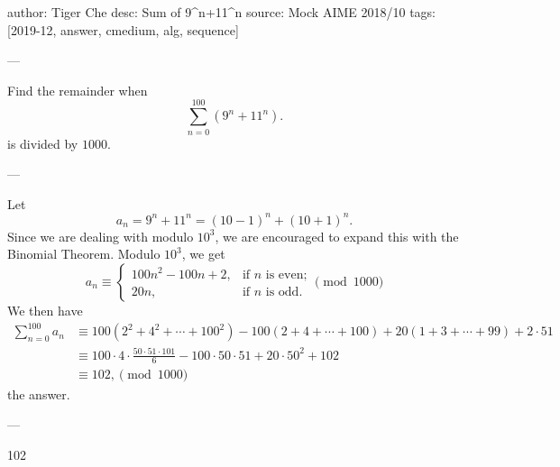 author: Tiger Che
desc: Sum of 9^n+11^n
source: Mock AIME 2018/10
tags: [2019-12, answer, cmedium, alg, sequence]

---

Find the remainder when \[\sum_{n=0}^{100}(9^n+11^n).\]
is divided by $1000$.

---

Let \[a_n=9^n+11^n=(10-1)^n+(10+1)^n.\]
Since we are dealing with modulo $10^3$, we are encouraged to expand this with the Binomial Theorem. Modulo $10^3$, we get\[a_n\equiv\begin{cases}
100n^2-100n+2, &\text{if $n$ is even;}\\
20n, &\text{if $n$ is odd.}
\end{cases}\pmod{1000}\]
We then have
\begin{align*}
\sum_{n=0}^{100}a_n&\equiv 100\left(2^2+4^2+\cdots+100^2\right)-100(2+4+\cdots+100)+20(1+3+\cdots+99)+2\cdot 51 \\
&\equiv 100\cdot 4\cdot\frac{50\cdot 51\cdot 101}{6}-100\cdot 50\cdot 51+20\cdot 50^2+102\\
&\equiv 102,\pmod{1000}
\end{align*}
the answer.

---

102
